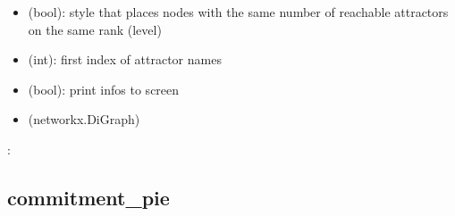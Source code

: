 \documentclass[letterpaper,10pt,english]{sphinxmanual}
\begin{document}
\begin{fulllineitems}
\begin{description}
\begin{itemize}
\item {} 
 (bool): style that places nodes with the same number of reachable attractors on the same rank (level)

\item {} 
 (int): first index of attractor names

\item {} 
 (bool): print infos to screen

\end{itemize}

\item[{\sphinxstylestrong{returns}::}] \leavevmode\begin{itemize}
\item {} 
 (networkx.DiGraph)

\end{itemize}

\end{description}

:

\begin{sphinxVerbatim}[commandchars=\\\{\}]
  
   
\end{sphinxVerbatim}

\end{fulllineitems}



\subsection{commitment\_pie}
\label{\detokenize{Basins:commitment-pie}}\label{\detokenize{Basins:id8}}
\end{document}
